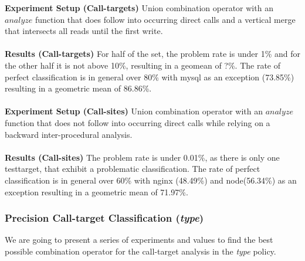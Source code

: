 \textbf{Experiment Setup (Call-targets)}
{Union combination operator with an $analyze$ function that does follow into occurring direct calls  and a vertical merge that intersects all reads until the first write.
}\\~\\
\textbf{Results (Call-targets)}{
For half of the set, the problem rate is under 1\% and for the other half it is not above 10\%, resulting in a geomean of ?\%. The rate of perfect classification is in general over 80\% with mysql as an exception (73.85\%) resulting in a geometric mean of 86.86\%.
}\\~\\
\textbf{Experiment Setup (Call-sites)}
{ Union combination operator with an $analyze$ function that does not follow into occurring direct calls while relying on a backward inter-procedural analysis.
}\\~\\
\textbf{Results (Call-sites)} {
The problem rate is under 0.01\%, as there is only one testtarget, that exhibit a problematic classification. The rate of perfect classification is in general over 60\% with nginx (48.49\%) and node(56.34\%) as an exception resulting in a geometric mean of 71.97\%.}





\subsubsection{Precision Call-target Classification (\textit{type})}
\label{subsection:typeshieldprecision}
We are going to present a series of experiments and values to find the best possible combination operator for the call-target analysis in the \textit{type} policy.

